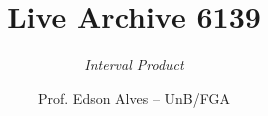 \title{Live Archive 6139}
\subtitle{\textit{Interval Product}}
\author{Prof. Edson Alves -- UnB/FGA}
\date{}
